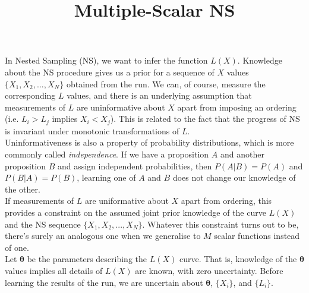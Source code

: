 \documentclass[a4paper, 11pt]{article}
\title{Multiple-Scalar NS}
\author{}
\begin{document}
\maketitle

In Nested Sampling (NS), we want to infer the function $L(X)$.
Knowledge about the NS procedure gives us a prior for a sequence of $X$ values
$\{X_1, X_2, ..., X_N\}$
obtained from the run. We can, of course, measure the corresponding $L$
values, and there is an underlying assumption that measurements of $L$ are
uninformative about $X$ apart from imposing an ordering
(i.e. $L_i > L_j$ implies $X_i < X_j$). This is related to the fact that the
progress of NS is invariant under monotonic transformations of $L$.\\

Uninformativeness is also a property of probability distributions, which
is more commonly called {\it independence}. If we have a proposition $A$ and
another proposition $B$ and assign independent probabilities, then
$P(A|B) = P(A)$ and $P(B|A) = P(B)$, learning one of $A$ and $B$
does not change our knowledge of the other.\\

If measurements of $L$ are uniformative about $X$ apart from ordering, this
provides a constraint on the assumed joint prior knowledge of the curve
$L(X)$ and the NS sequence $\{X_1, X_2, ..., X_N\}$. Whatever this constraint
turns out to be, there's surely an analogous one when we generalise to
$M$ scalar functions instead of one.\\

Let $\boldsymbol{\theta}$ be the parameters describing the $L(X)$ curve. That
is, knowledge of the $\boldsymbol{\theta}$ values implies all details of
$L(X)$ are known, with zero uncertainty. Before learning the results of the
run, we are uncertain about $\boldsymbol{\theta}$, $\{X_i\}$, and $\{L_i\}$.
\end{document}
